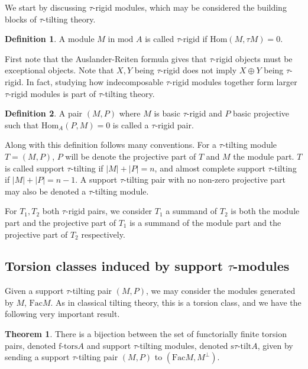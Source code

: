 \documentclass[]{article}
\theoremstyle{definition}
\newtheorem{definition}{Definition}[section]
\newtheorem{theorem}{Theorem}[section]
\newcommand{\mo}{\ensuremath{\text{mod }}}
\newcommand{\Hom}{\ensuremath{\text{Hom}}}
\newcommand{\tu}{\ensuremath{\tau}}
\newcommand{\Fac}{\ensuremath{\text{Fac}}}
\begin{document}
We start by discussing $\tau$-rigid modules, which may be considered the building blocks of $\tau$-tilting theory. 


\begin{definition}
	A module $M$ in $\mo A$ is called $\tau$-rigid if $\Hom(M,\tau M) = 0$.
\end{definition}

First note that the Auslander-Reiten formula gives that \tu-rigid objects must be exceptional objects. Note that $X,Y$ being $\tau$-rigid does not imply $X \oplus Y$ being $\tau$-rigid. In fact, studying how indecomposable $\tau$-rigid modules together form larger $\tau$-rigid modules is part of $\tau$-tilting theory.

\begin{definition}\cite[Definition 0.3]{tau}
	A pair $(M,P)$ where $M$ is basic $\tau$-rigid and $P$ basic projective such that $\Hom_A(P,M) = 0$ is called a  $\tau$-rigid pair.
\end{definition}

Along with this definition follows many conventions. For a  $\tau$-tilting module $T = (M,P)$, $P$ will be denote the projective part of $T$ and $M$ the module part. $T$ is called support \tu-tilting if $|M| + |P| = n$, and almost complete support \tu-tilting if $|M| + |P| = n - 1$. A support \tu-tilting pair with no non-zero projective part may also be denoted a \tu-tilting module. 

For $T_1,T_2$ both \tu-rigid pairs, we consider $T_1$ a summand of $T_2$ is both the module part and the projective part of $T_1$ is a summand of the module part and the projective part of $T_2$ respectively.


\subsection{Torsion classes induced by support \tu-modules}
Given a support \tu-tilting pair $(M,P)$, we may consider the modules generated by $M$, $\Fac M$. As in classical tilting theory, this is a torsion class, and we have the following very important result.

\begin{theorem}\cite[Theorem 2.7]{tau}\cite{auslandersmalo81}
	There is a bijection between the set of functorially finite torsion pairs, denoted $\text{f-tors} A$ and support \tu-tilting modules, denoted $\text{s}\tu\text{-tilt} A$, given by sending a support \tu-tilting pair $(M,P)$ to $(\Fac M,M^\perp)$.
\end{theorem}
\end{document}

